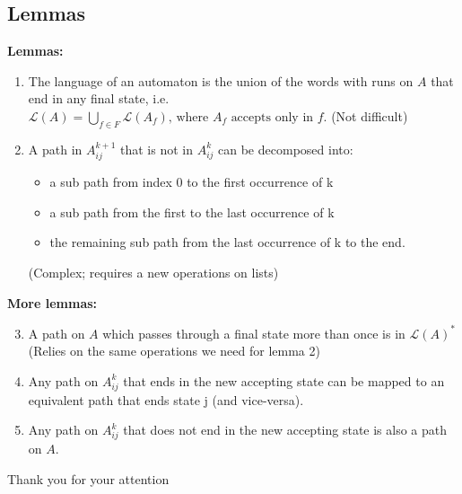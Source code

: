\documentclass{beamer}
\begin{document}
\subsection*{Lemmas}
\begin{frame}
    \textbf{Lemmas:}

    \begin{enumerate}
        \item The language of an automaton is the union of the words with runs on $A$ that end in any final state, i.e. 
            $\mathcal{L}(A) = \bigcup_{f \in F} \mathcal{L}(A_f) \mbox {, where $A_f$ accepts only in $f$}.$ (Not difficult)
        \item
            A path in $A^{k+1}_{i j}$ that is not in $A^{k}_{i j}$ can be decomposed into:\\
            \begin{itemize}
                \item a sub path from index 0 to the first occurrence of k
                \item a sub path from the first to the last occurrence of k
                \item the remaining sub path from the last occurrence of k to the end.
            \end{itemize}
            (Complex; requires a new operations on lists)
    \end{enumerate}
    
\end{frame}

\begin{frame}
    \textbf{More lemmas:} 

    \begin{enumerate}

    \setcounter{enumi}{2}
\item A path on $A$ which passes through a final state more than once is in $\mathcal{L}(A)^*$ (Relies on the same operations we need for lemma 2)
        \item Any path on $A^k_{i j}$ that ends in the new accepting state can be mapped to an equivalent path that ends state j (and vice-versa).
        \item Any path on $A^k_{i j}$ that does not end in the new accepting state is also a path on $A$.
    \end{enumerate}

\end{frame}

\begin{frame}
        \huge Thank you for your attention
\end{frame}
\end{document}

